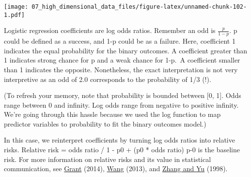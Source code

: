 \documentclass[
]{book}
\newenvironment{Shaded}{\begin{snugshade}}{\end{snugshade}}
\newcommand{\CommentTok}[1]{\textcolor[rgb]{0.56,0.35,0.01}{\textit{#1}}}
\newcommand{\ControlFlowTok}[1]{\textcolor[rgb]{0.13,0.29,0.53}{\textbf{#1}}}
\newcommand{\DecValTok}[1]{\textcolor[rgb]{0.00,0.00,0.81}{#1}}
\newcommand{\FunctionTok}[1]{\textcolor[rgb]{0.00,0.00,0.00}{#1}}
\newcommand{\NormalTok}[1]{#1}
\newcommand{\OtherTok}[1]{\textcolor[rgb]{0.56,0.35,0.01}{#1}}
\newcommand{\SpecialCharTok}[1]{\textcolor[rgb]{0.00,0.00,0.00}{#1}}
\newcommand{\StringTok}[1]{\textcolor[rgb]{0.31,0.60,0.02}{#1}}
\begin{document}
\texttt{[image: 07\_high\_dimensional\_data\_files/figure-latex/unnamed-chunk-102-1.pdf]}

Logistic regression coefficients are log odds ratios. Remember an odd is \(\frac{p}{1-p}\). p could be defined as a success, and 1-p could be as a failure. Here, coefficient 1 indicates the equal probability for the binary outcomes. A coefficient greater than 1 indicates strong chance for p and a weak chance for 1-p.~A coefficient smaller than 1 indicates the opposite. Nonetheless, the exact interpretation is not very interpretive as an odd of 2.0 corresponds to the probability of 1/3 (!).

(To refresh your memory, note that probability is bounded between {[}0, 1{]}. Odds range between 0 and infinity. Log odds range from negative to positive infinity. We're going through this hassle because we used the log function to map predictor variables to probability to fit the binary outcomes model.)

In this case, we reinterpret coefficients by turning log odds ratios into relative risks. Relative risk = odds ratio / 1 - p0 + (p0 * odds ratio) p-0 is the baseline risk. For more information on relative risks and its value in statistical communication, see \href{https://www.bmj.com/content/348/bmj.f7450}{Grant} (2014), \href{https://www.jstatsoft.org/article/view/v055i05}{Wang} (2013), and \href{https://jamanetwork.com/journals/jama/fullarticle/188182}{Zhang and Yu} (1998).

\begin{Shaded}
\end{Shaded}
\end{document}
